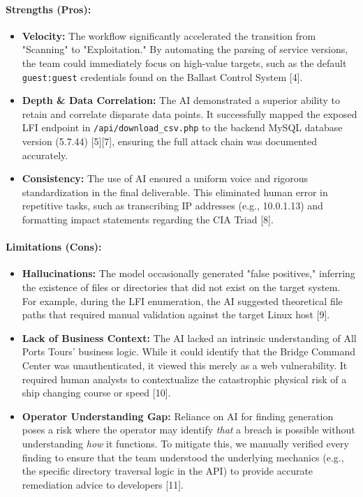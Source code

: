 \paragraph{Strengths (Pros):}
\begin{itemize}
    \item \textbf{Velocity:} The workflow significantly accelerated the transition from "Scanning" to "Exploitation." By automating the parsing of service versions, the team could immediately focus on high-value targets, such as the default \texttt{guest:guest} credentials found on the Ballast Control System [4].
    \item \textbf{Depth \& Data Correlation:} The AI demonstrated a superior ability to retain and correlate disparate data points. It successfully mapped the exposed LFI endpoint in \texttt{/api/download\_csv.php} to the backend MySQL database version (5.7.44) [5][7], ensuring the full attack chain was documented accurately.
    \item \textbf{Consistency:} The use of AI ensured a uniform voice and rigorous standardization in the final deliverable. This eliminated human error in repetitive tasks, such as transcribing IP addresses (e.g., 10.0.1.13) and formatting impact statements regarding the CIA Triad [8].
\end{itemize}

\paragraph{Limitations (Cons):}
\begin{itemize}
    \item \textbf{Hallucinations:} The model occasionally generated "false positives," inferring the existence of files or directories that did not exist on the target system. For example, during the LFI enumeration, the AI suggested theoretical file paths that required manual validation against the target Linux host [9].
    \item \textbf{Lack of Business Context:} The AI lacked an intrinsic understanding of All Ports Tours' business logic. While it could identify that the Bridge Command Center was unauthenticated, it viewed this merely as a web vulnerability. It required human analysts to contextualize the catastrophic physical risk of a ship changing course or speed [10].
    \item \textbf{Operator Understanding Gap:} Reliance on AI for finding generation poses a risk where the operator may identify \textit{that} a breach is possible without understanding \textit{how} it functions. To mitigate this, we manually verified every finding to ensure that the team understood the underlying mechanics (e.g., the specific directory traversal logic in the API) to provide accurate remediation advice to developers [11].
\end{itemize}